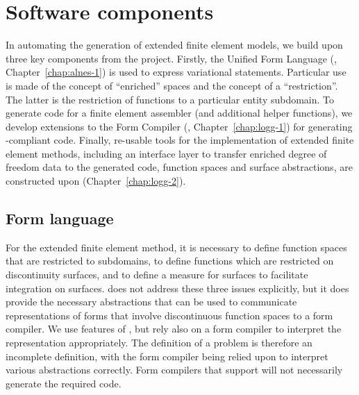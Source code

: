 \section{Software components}

In automating the generation of extended finite element models, we
build upon three key components from the \fenics{} project. Firstly,
the Unified Form Language (\ufl{}, Chapter~\ref{chap:alnes-1}) is used
to express variational statements. Particular use is made of the
concept of ``enriched'' spaces and the \ufl{} concept of a
``restriction''. The latter is the restriction of functions to a
particular entity subdomain.  To generate code for a finite element
assembler (and additional helper functions), we develop extensions to
the \fenics{} Form Compiler (\ffc{}, Chapter~\ref{chap:logg-1}) for
generating \ufc{}-compliant code. Finally, re-usable tools for the
implementation of extended finite element methods, including an
interface layer to transfer enriched degree of freedom data to the
generated code, function spaces and surface abstractions, are
constructed upon \dolfin{} (Chapter~\ref{chap:logg-2}).
\subsection{Form language}

For the extended finite element method, it is necessary to define
function spaces that are restricted to subdomains, to define
functions which are restricted on discontinuity surfaces, and to define a
measure for surfaces to facilitate integration on surfaces.  \ufl{}
does not address these three issues explicitly, but it does provide the
necessary abstractions that can be used to communicate representations of
forms that involve discontinuous function spaces to a form compiler. We
use features of \ufl{}, but rely also on a form compiler to interpret
the \ufl{} representation appropriately.  The \ufl{} definition of a
problem is therefore an incomplete definition, with the form compiler
being relied upon to interpret various abstractions correctly.
Form compilers that support \ufl{} will not necessarily generate the
required code.

